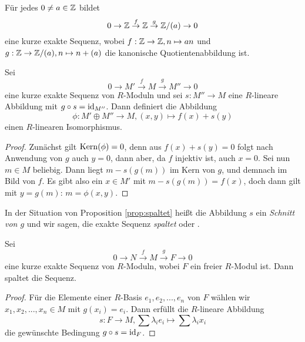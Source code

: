 \documentclass{book}
\begin{document}
\begin{exa}
    \label{exa:ses}
    Für jedes $0 \ne a \in \mathbb{Z}$ bildet
    \[
        0 \to \mathbb{Z} \overset{f}{\to} \mathbb{Z} \overset{g}{\to} \mathbb{Z}/(a) \to 0
    \]
    eine kurze exakte Sequenz, wobei $f: \mathbb{Z} \to \mathbb{Z}, n \mapsto an$ und $g: \mathbb{Z}
    \to \mathbb{Z}/(a), n \mapsto n + (a)$ die kanonische Quotientenabbildung ist. 
\end{exa}

\begin{prop}
    \label{prop:spaltet} Sei 
    \[
        0 \to M' \overset{f}{\to} M \overset{g}{\to} M'' \to 0
    \]
    eine kurze exakte Sequenz von $R$-Moduln und sei $s: M'' \to M$ eine
    $R$-lineare Abbildung mit $g \circ s = \operatorname{id}_{M''}$. Dann definiert die Abbildung
    \begin{equation}
        \label{eq:splitsum}
            \phi: M' \oplus M'' \to M, (x,y) \mapsto f(x) + s(y)
    \end{equation}
    einen $R$-linearen Isomorphismus.
\end{prop}
\begin{proof}
    Zunächst gilt $\Kern(\phi) = 0$, denn aus $f(x) + s(y) = 0$ folgt nach
    Anwendung von $g$ auch $y=0$, dann aber, da $f$ injektiv ist, auch $x=0$.
    Sei nun $m \in M$ beliebig. Dann liegt $m - s(g(m))$ im Kern von $g$, und
    demnach im Bild von $f$. Es gibt also ein $x \in M'$ mit $m - s(g(m)) =
    f(x)$, doch dann gilt mit $y = g(m)$: $m = \phi(x,y)$. 
\end{proof}

\begin{rem}
    \label{rem:spaltet}
    In der Situation von Proposition \ref{prop:spaltet} heißt die Abbildung $s$
    ein {\em Schnitt von $g$} und wir sagen, die exakte Sequenz {\em spaltet} oder {\em {}}.
\end{rem}

\begin{prop}
    \label{prop:freesplit}
    Sei 
    \[
        0 \to N \overset{f}{\to} M \overset{g}{\to} F \to 0
    \]
    eine kurze exakte Sequenz von $R$-Moduln, wobei $F$ ein freier $R$-Modul ist.
    Dann spaltet die Sequenz. 
\end{prop}
\begin{proof}
    Für die Elemente einer $R$-Basis $e_1, e_2, ..., e_n$ von $F$ wählen wir
    $x_1, x_2, ..., x_n \in M$ mit $g(x_i) = e_i$. Dann erfüllt die $R$-lineare Abbildung
    \[
        s: F \to M, \sum \lambda_i e_i \mapsto \sum \lambda_i x_i
    \]
    die gewünschte Bedingung $g \circ s = \operatorname{id}_F$. 
\end{proof}
\end{document}
